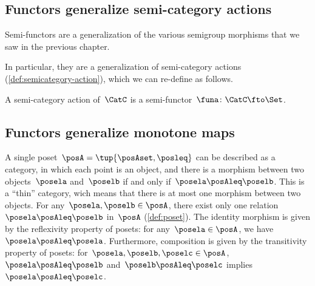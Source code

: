 
\subsection{Functors generalize semi-category actions}


Semi-functors are a generalization of the various semigroup morphisms that we saw in the previous chapter.


In particular, they are a generalization of semi-category actions (\cref{def:semicategory-action}), which we can re-define as follows.

\begin{ctdefinition}
    A semi-category action of~$\CatC$ is a semi-functor~$\funa\colon \CatC \fto \Set$.
\end{ctdefinition}

\subsection{Functors generalize monotone maps}
\label{sec:posetsarecats}

A single poset~$\posA=\tup{\posAset, \posleq}$ can be described as a category, in which each point is an object, and there is a morphism between two objects~$\posela$ and~$\poselb$ if and only if~$\posela \posAleq \poselb$.
This is a ``thin'' category, wich means that there is at most one morphism between two objects.
For any~$\posela,\poselb\in \posA$, there exist only one relation~$\posela\posAleq \poselb$ in~$\posA$ (\cref{def:poset}).
The identity morphism is given by the reflexivity property of posets: for any~$\posela\in \posA$, we have~$\posela \posAleq \posela$.
Furthermore, composition is given by the transitivity property of posets: for~$\posela,\poselb,\poselc \in \posA$,~$\posela\posAleq \poselb$ and~$\poselb\posAleq \poselc$ implies~$\posela\posAleq \poselc$.

